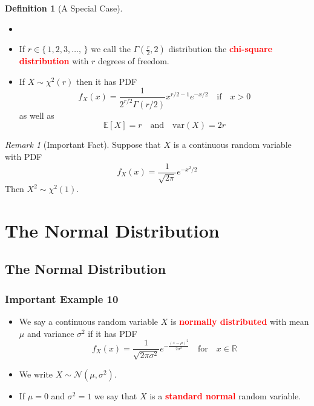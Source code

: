 \documentclass{article}
\newcommand{\R}{\mathbb{R}}
\newcommand{\E}{\mathbb{E}}
\newcommand{\var}{\text{var}}
\newcommand{\bfred}[1]{\textcolor{red}{\textbf{#1}}}
\theoremstyle{plain}
\theoremstyle{definition}
\newtheorem{defn}{Definition}[section]
\theoremstyle{remark}
\newtheorem*{rem}{Remark}
\begin{document}
\begin{defn}[A Special Case]
    \begin{itemize}
        \item []
        \item If $r \in \{\,1,2,3,\dotsc,\,\}$ we call the $\Gamma(\frac{r}{2},2)$ distribution the \bfred{chi-square distribution} with $r$ degrees of freedom.
        \item If $X\sim\chi^2(r)$ then it has PDF \[f_X(x)=\frac{1}{2^{r/2}\Gamma(r/2)}x^{r/2-1}e^{-x/2} \quad \text{if} \quad x>0\] as well as \[\E[X]=r \quad \text{and} \quad \var(X)=2r\]
    \end{itemize}
\end{defn}

\begin{rem}[Important Fact]
    Suppose that $X$ is a continuous random variable with PDF \[f_X(x)=\frac{1}{\sqrt{2\pi}}e^{-x^2/2}\] Then $X^2\sim\chi^2(1)$.
\end{rem}

\section{The Normal Distribution}

\subsection{The Normal Distribution}

\subsubsection*{Important Example 10}

\begin{tcolorbox}[title = Normal Distribution, colback = SkyBlue!5!white,colframe = SkyBlue!75!black]
    \begin{itemize}
        \item We say a continuous random variable $X$ is \bfred{normally distributed} with mean $\mu$ and variance $\sigma^2$ if it has PDF \[f_X(x)=\frac{1}{\sqrt{2\pi\sigma^2}}e^{-\frac{(x-\mu)^2}{2\sigma^2}} \quad \text{for} \quad x\in\R\] 
        \item We write $X\sim\mathcal{N}(\mu,\sigma^2)$.
        \item If $\mu=0$ and $\sigma^2=1$ we say that $X$ is a \bfred{standard normal} random variable.
    \end{itemize}
\end{tcolorbox}
\end{document}
